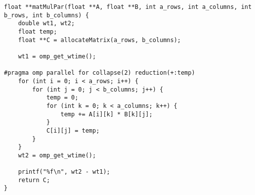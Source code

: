 \begin{code}
    \begin{verbatim}
float **matMulPar(float **A, float **B, int a_rows, int a_columns, int b_rows, int b_columns) {
    double wt1, wt2;
    float temp;
    float **C = allocateMatrix(a_rows, b_columns);

    wt1 = omp_get_wtime();

#pragma omp parallel for collapse(2) reduction(+:temp)
    for (int i = 0; i < a_rows; i++) {
        for (int j = 0; j < b_columns; j++) {
            temp = 0;
            for (int k = 0; k < a_columns; k++) {
                temp += A[i][k] * B[k][j];
            }
            C[i][j] = temp;
        }
    }
    wt2 = omp_get_wtime();

    printf("%f\n", wt2 - wt1);
    return C;
}
    \end{verbatim}
\end{code}
